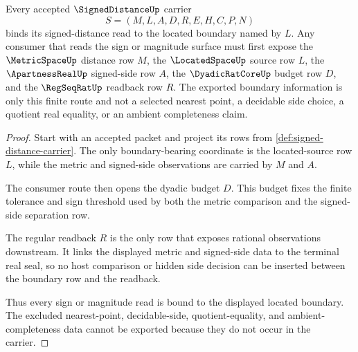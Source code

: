\begin{theorem}
\label{thm:signed-distance-located-boundary}
Every accepted $\SignedDistanceUp$ carrier
$$
S=(M,L,A,D,R,E,H,C,P,N)
$$
binds its signed-distance read to the located boundary named by $L$. Any consumer that reads the sign or magnitude surface must first expose the $\MetricSpaceUp$ distance row $M$, the $\LocatedSpaceUp$ source row $L$, the $\ApartnessRealUp$ signed-side row $A$, the $\DyadicRatCoreUp$ budget row $D$, and the $\RegSeqRatUp$ readback row $R$. The exported boundary information is only this finite route and not a selected nearest point, a decidable side choice, a quotient real equality, or an ambient completeness claim.
\end{theorem}
\begin{proof}
Start with an accepted packet and project its rows from \autoref{def:signed-distance-carrier}. The only boundary-bearing coordinate is the located-source row $L$, while the metric and signed-side observations are carried by $M$ and $A$.

The consumer route then opens the dyadic budget $D$. This budget fixes the finite tolerance and sign threshold used by both the metric comparison and the signed-side separation row.

The regular readback $R$ is the only row that exposes rational observations downstream. It links the displayed metric and signed-side data to the terminal real seal, so no host comparison or hidden side decision can be inserted between the boundary row and the readback.

Thus every sign or magnitude read is bound to the displayed located boundary. The excluded nearest-point, decidable-side, quotient-equality, and ambient-completeness data cannot be exported because they do not occur in the carrier.
\end{proof}

